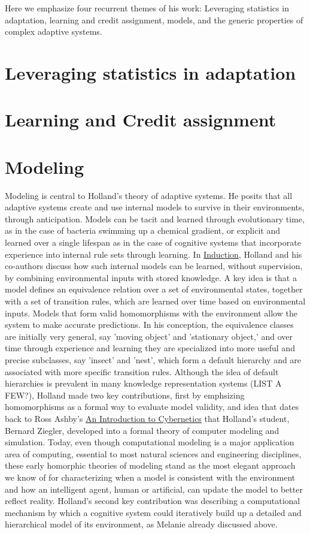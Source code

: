 \documentclass{sig-alternate}
\begin{document}
Here we emphasize four recurrent themes of his work: Leveraging statistics in adaptation, learning and credit assignment, models, and the generic properties of complex adaptive systems.

\section{Leveraging statistics in adaptation}

\section{ Learning and Credit assignment}

\section{Modeling}

Modeling is central to Holland's theory of adaptive systems.  He posits that all adaptive systems create and use internal models to survive in their environments, through anticipation.  Models can be tacit and learned through evolutionary time, as in the case of bacteria swimming up a chemical gradient, or explicit and learned over a single lifespan as in the case of cognitive systems that incorporate experience into internal rule sets through learning.  In \underline{Induction}, Holland and his co-authors discuss how such internal models can be learned, without supervision, by combining environmental inputs with stored knowledge.  A key idea is that a model defines an equivalence relation over a set of environmental states, together with a set of transition rules, which are learned over time based on environmental inputs.  Models that form valid homomorphisms with the environment allow the system to make accurate predictions.  In his conception, the equivalence classes are initially very general, say 'moving object' and 'stationary object,' and over time through experience and learning they are specialized into more useful and precise subclasses, say 'insect' and 'nest', which form a default hierarchy and are associated with more specific transition rules.  Although the idea of default hierarchies is prevalent in many knowledge representation systems (LIST A FEW?), Holland made two key contributions, first by emphsizing homomorphisms as a formal way to evaluate model validity, and idea that dates back to Ross Ashby's \underline{An Introduction to Cybernetics} that Holland's student, Bernard Ziegler, developed into a formal theory of computer modeling and simulation.  Today, even though computational modeling is a major application area of computing,  essential to most natural sciences and engineering disciplines, these early homorphic theories of modeling stand as the most elegant approach we know of for characterizing when a model is consistent with the environment and how an intelligent agent, human or artificial, can update the model to better reflect reality.
Holland's second key contribution was describing a computational mechanism by which a cognitive system could iteratively build up a detailed and hierarchical model of its environment, as Melanie already discussed above.
\end{document}
